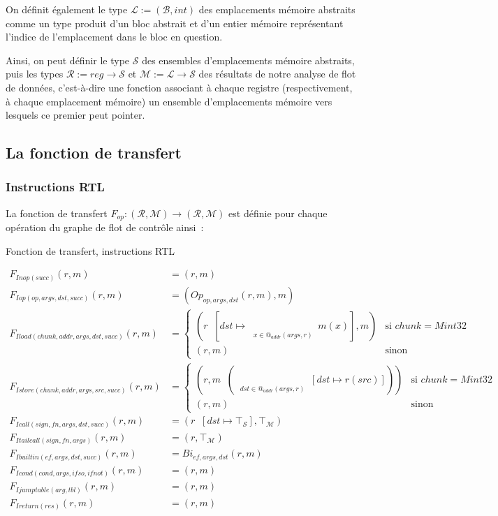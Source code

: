 \documentclass{article}
\makeatletter
\newcommand\mi{\mathit}
\newcommand\F[1]{F_{\mi{#1}}}
\newcommand\Op[1]{Op_{\mi{#1}}}
\newcommand\Bi[1]{Bi_{\mi{#1}}}
\newcommand\At[1]{@_{\mi{#1}}}
\newcommand\tB{\mathcal{B}}
\newcommand\tL{\mathcal{L}}
\newcommand\tS{\mathcal{S}}
\newcommand\tR{\mathcal{R}}
\newcommand\tM{\mathcal{M}}
\DeclareMathOperator*{\lubR}{{\sqcup}_\tR}
\DeclareMathOperator*{\lubM}{{\sqcup}_\tM}
\DeclareMathOperator*{\LUBS}{{\bigsqcup}_\tS}
\DeclareMathOperator*{\LUBM}{{\bigsqcup}_\tM}
\makeatother
\begin{document}
On définit également le type $\tL := (\tB, int)$ des emplacements mémoire
abstraits comme un type produit d'un bloc abstrait et d'un entier mémoire
représentant l'indice de l'emplacement dans le bloc en question.

Ainsi, on peut définir le type $\tS$ des ensembles d'emplacements mémoire
abstraits, puis les types $\mathcal{R} := reg \rightarrow \mathcal{S}$ et
$\mathcal{M} := \mathcal{L} \rightarrow \mathcal{S}$ des résultats de notre
analyse de flot de données, c'est-à-dire une fonction associant à chaque
registre (respectivement, à chaque emplacement mémoire) un ensemble
d'emplacements mémoire vers lesquels ce premier peut pointer.

\newpage
\subsection{La fonction de transfert}

\subsubsection*{Instructions RTL}

La fonction de transfert $F_{op}: (\tR, \tM) \rightarrow (\tR, \tM)$ est
définie pour chaque opération du graphe de flot de contrôle ainsi~:

\begin{formulae}
\caption{Fonction de transfert, instructions RTL}
\label{transf}
\begin{align*}
\F{Inop(succ)}(r, m) &= (r, m)
\\
\F{Iop(op, args, dst, succ)}(r, m) &= (\Op{op, args, dst}(r, m), m)
\\
\F{Iload(chunk, addr, args, dst, succ)}(r, m) &=
\begin{cases}
(r \lubR [\mi{dst} \mapsto
{\LUBS\limits_{\substack{x \in \At{addr}(\mi{args}, r)}}}
m(x)], m) & \text{si } chunk = Mint32
\\
(r, m) & \text{sinon}
\end{cases}
\\
\F{Istore(chunk, addr, args, src, succ)}(r, m) &=
\begin{cases}
(r, m \lubM (
\LUBM\limits_{\substack{\mi{dst} \in @_{addr}(\mi{args}, r)}}
[\mi{dst} \mapsto r(\mi{src})]))
& \text{si } chunk = Mint32
\\
(r, m)
& \text{sinon}
\end{cases}
\\
\F{Icall(sign, fn, args, dst, succ)}(r, m) &=
(r \lubR [\mi{dst} \mapsto \top_\tS], \top_\tM)
\\
\F{Itailcall(sign, fn, args)}(r, m) &= (r, \top_\tM)
\\
\F{Ibuiltin(ef, args, dst, succ)}(r, m) &= \Bi{ef, args, dst}(r, m)
\\
\F{Icond(cond, args, ifso, ifnot)}(r, m) &= (r, m)
\\
\F{Ijumptable(arg, tbl)}(r, m) &= (r, m)
\\
\F{Ireturn(res)}(r, m) &= (r, m)
\end{align*}
\end{formulae}
\end{document}
